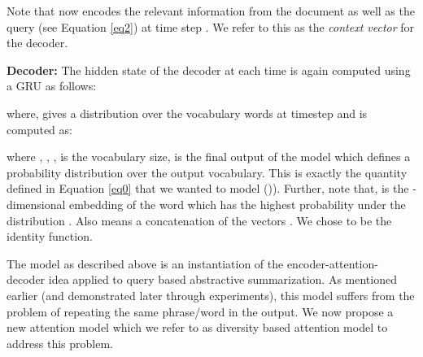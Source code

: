 \documentclass[11pt]{article}
\begin{document}
Note that  now encodes the relevant information from the document as well as the query (see Equation \eqref{eq2}) at time step . We refer to this as the \textit{context vector} for the decoder.

\noindent \textbf{Decoder:} The hidden state of the decoder  at each time  is again computed using a GRU as follows:



\noindent where,  gives a distribution over the vocabulary words at timestep  and is computed as: 



\noindent where , , ,  is the vocabulary size,  is the final output of the model which defines a probability distribution over the output vocabulary. This is exactly the quantity defined in Equation \eqref{eq0} that we wanted to model ()). Further, note that,  is the -dimensional embedding of the word which has the highest probability under the distribution . Also  means a concatenation of the vectors . We chose  to be the identity function. 


\fi 
 The model as  described above is an instantiation of the encoder-attention-decoder idea applied to query based abstractive summarization. As mentioned earlier (and demonstrated later through experiments), this model suffers from the problem of repeating the same phrase/word in the output. We now propose  a new attention model which we refer to as diversity based attention model to address this problem.
\end{document}
